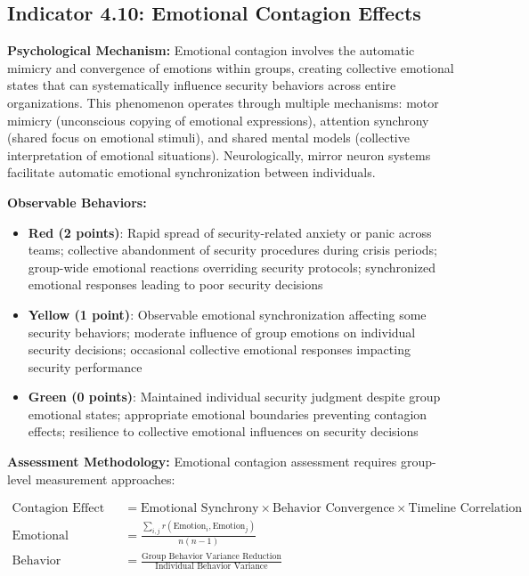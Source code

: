 \documentclass[11pt,a4paper]{article}
\begin{document}
\subsection{Indicator 4.10: Emotional Contagion Effects}

\textbf{Psychological Mechanism:}
Emotional contagion involves the automatic mimicry and convergence of emotions within groups, creating collective emotional states that can systematically influence security behaviors across entire organizations\cite{hatfield1994}. This phenomenon operates through multiple mechanisms: motor mimicry (unconscious copying of emotional expressions), attention synchrony (shared focus on emotional stimuli), and shared mental models (collective interpretation of emotional situations). Neurologically, mirror neuron systems facilitate automatic emotional synchronization between individuals.

\textbf{Observable Behaviors:}
\begin{itemize}
\item \textbf{Red (2 points)}: Rapid spread of security-related anxiety or panic across teams; collective abandonment of security procedures during crisis periods; group-wide emotional reactions overriding security protocols; synchronized emotional responses leading to poor security decisions
\item \textbf{Yellow (1 point)}: Observable emotional synchronization affecting some security behaviors; moderate influence of group emotions on individual security decisions; occasional collective emotional responses impacting security performance
\item \textbf{Green (0 points)}: Maintained individual security judgment despite group emotional states; appropriate emotional boundaries preventing contagion effects; resilience to collective emotional influences on security decisions
\end{itemize}

\textbf{Assessment Methodology:}
Emotional contagion assessment requires group-level measurement approaches:

\begin{align}
\text{Contagion Effect Index} &= \text{Emotional Synchrony} \times \text{Behavior Convergence} \times \text{Timeline Correlation} \\
\text{Emotional Synchrony} &= \frac{\sum_{i,j} r(\text{Emotion}_i, \text{Emotion}_j)}{n(n-1)} \\
\text{Behavior Convergence} &= \frac{\text{Group Behavior Variance Reduction}}{\text{Individual Behavior Variance}}
\end{align}
\end{document}
